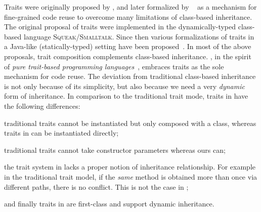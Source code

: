 Traits were originally proposed by \citet{scharli2003traits}, and later formalized by ~\cite{Ducasse_2006} as a mechanism
for fine-grained code reuse to overcome many limitations of class-based
inheritance. The original proposal of traits were implemented in the
dynamically-typed class-based language \textsc{Squeak/Smalltalk}. Since then
various formalizations of traits in a Java-like (statically-typed) setting have
been proposed~\citep{fisher2004typed,scharli2003traitsformal,chai_trait,
  JOT:issue_2006_05/article4}. In most of the above proposals, trait composition
complements class-based inheritance. \sedel, in the spirit of \textit{pure trait-based programming languages}~\citep{BETTINI2013521, BETTINI2017419},
embraces traits as the sole mechanism for code reuse. The deviation from
traditional class-based inheritance is not only because of its simplicity, but
also because we need a very \emph{dynamic} form of inheritance. In comparison to
the traditional trait mode, traits in \sedel have the following differences:
\begin{inparaenum}[(1)]
\item traditional traits cannot be instantiated but only composed with a class,
  whereas traits in \sedel can be instantiated directly;
\item traditional traits cannot take constructor parameters whereas ours can;
\item the trait system in \sedel lacks a proper notion of inheritance
  relationship. For example in the traditional trait model, if the \textit{same}
  method is obtained more than once via different paths, there is no conflict.
  This is not the case in \sedel;
\item and finally traits in \sedel are first-class and support dynamic
  inheritance.
\end{inparaenum}




